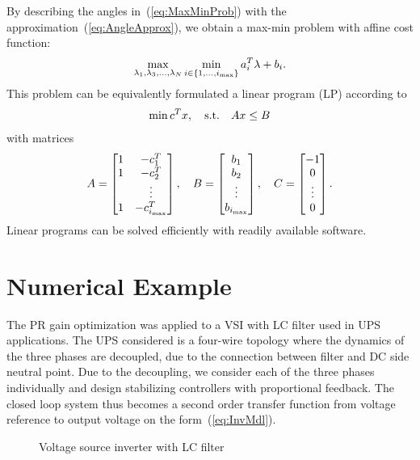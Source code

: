 \documentclass[conference,10pt]{IEEEtran}
\begin{document}
By describing the angles in~(\ref{eq:MaxMinProb})
with the approximation~(\ref{eq:AngleApprox}), we obtain a max-min problem with affine cost function:
\begin{align}
\label{eq:MaxMinProbApprox}
\max_{\lambda_1,\lambda_3,\dots, \lambda_N}\min_{i\in \{1, \dots, i_{\rm max}\}} a_i^T\lambda + b_i.
\end{align}
 This problem can be equivalently formulated a linear program (LP) according to
\begin{align}
\label{eq:MaxMinProbLP}
\min c^Tx,\quad {\rm s.t.} \quad Ax\le B
\end{align}
with matrices
\begin{align*}
A =
\begin{bmatrix}
1 & -c^T_1\\
1 & -c^T_2\\
 & \vdots \\
1 & -c^T_{i_{\rm max}}
\end{bmatrix},\quad
B =
\begin{bmatrix}
b_1\\
b_2\\
\vdots \\
b_{i_{\rm max}}
\end{bmatrix},\quad
C =
\begin{bmatrix}
-1\\
0\\
\vdots \\
0
\end{bmatrix}.
\end{align*}
Linear programs can be solved efficiently with readily available software.



\section{Numerical Example}

The PR gain optimization was applied to a VSI with LC filter used in UPS applications. 
The UPS considered is a four-wire topology where the dynamics of the three phases are decoupled, due to the connection between filter and DC side neutral point. Due to the decoupling, we consider each of the three phases individually and design stabilizing controllers with proportional feedback. The closed loop system thus becomes a second order transfer function from voltage reference to output voltage on the form~(\ref{eq:InvMdl}).
\begin{figure}[!h]
\centering
{}
\psfrag{+}{\tiny{$+$}}
\scalebox{0.9}{

}
\caption{Voltage source inverter with LC filter}
\label{fig:UPS_LC}
\end{figure}
\end{document}

